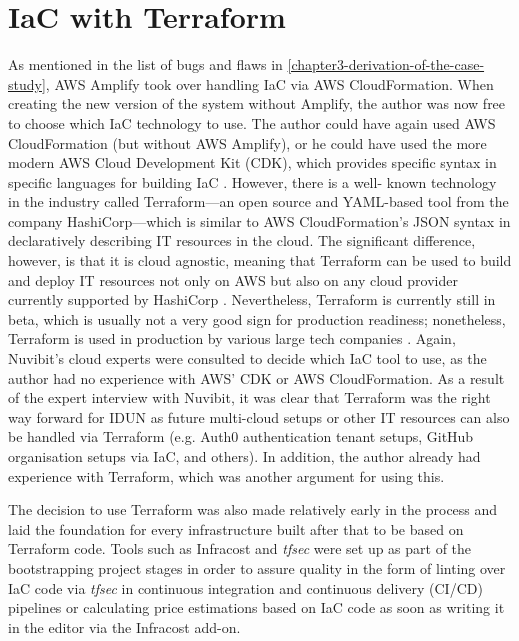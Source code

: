 \section*{IaC with Terraform}
\label{chapter4-iac-with-terraform}

As mentioned in the list of bugs and flaws in \autoref{chapter3-derivation-of-the-case-study}, AWS Amplify took over handling IaC via AWS CloudFormation. When creating the new version of the system without Amplify, the author was now free to choose which IaC technology to use. The author could have again used AWS CloudFormation (but without AWS Amplify), or he could have used the more modern AWS Cloud Development Kit (CDK), which provides specific syntax in specific languages for building IaC \citep{amazon_web_services_inc_aws_nodate}. However, there is a well- known technology in the industry called Terraform—an open source and YAML-based tool from the company HashiCorp—which is similar to AWS CloudFormation’s JSON syntax in declaratively describing IT resources in the cloud. The significant difference, however, is that it is cloud agnostic, meaning that Terraform can be used to build and deploy IT resources not only on AWS but also on any cloud provider currently supported by HashiCorp \citep{hashicorp_browse_nodate}. Nevertheless, Terraform is currently still in beta, which is usually not a very good sign for production readiness; nonetheless, Terraform is used in production by various large tech companies \citep{stackshare_why_nodate}. Again, Nuvibit’s cloud experts were consulted to decide which IaC tool to use, as the author had no experience with AWS’ CDK or AWS CloudFormation. As a result of the expert interview with Nuvibit, it was clear that Terraform was the right way forward for IDUN as future multi-cloud setups or other IT resources can also be handled via Terraform (e.g. Auth0 authentication tenant setups, GitHub organisation setups via IaC, and others). In addition, the author already had experience with Terraform, which was another argument for using this.


The decision to use Terraform was also made relatively early in the process and laid the foundation for every infrastructure built after that to be based on Terraform code. Tools such as Infracost and \textit{tfsec} were set up as part of the bootstrapping project stages in order to assure quality in the form of linting over IaC code via \textit{tfsec} in continuous integration and continuous delivery (CI/CD) pipelines or calculating price estimations based on IaC code as soon as writing it in the editor via the Infracost add-on.

